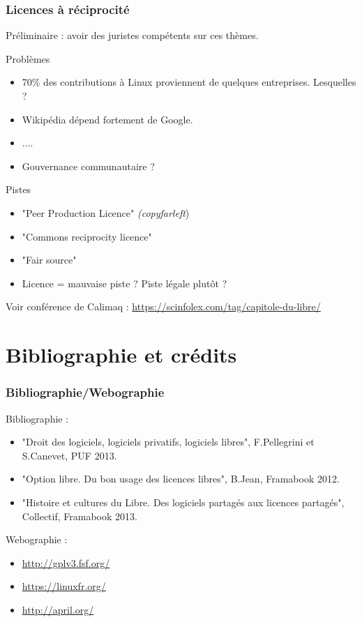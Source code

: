 \documentclass{beamer}
\begin{document}
\begin{frame}\frametitle{Licences à réciprocité}

  Préliminaire : avoir des juristes compétents sur ces thèmes.

  \begin{block}{Problèmes}
    \begin{itemize}
    \item 70\% des contributions à Linux proviennent de quelques
      entreprises. Lesquelles ?
    \item Wikipédia dépend fortement de Google.
    \item ....
    \item Gouvernance communautaire ?
    \end{itemize}
  \end{block}

  \begin{block}{Pistes}
    \begin{itemize}
    \item "Peer Production Licence" \textit{(copyfarleft})
    \item "Commons reciprocity licence"
    \item "Fair source"
    \item Licence = mauvaise piste ? Piste légale plutôt ?
    \end{itemize}
  
  \end{block}
  
  Voir conférence de Calimaq :
  \url{https://scinfolex.com/tag/capitole-du-libre/}
  
\end{frame}

\section{Bibliographie et crédits}

\begin{frame}\frametitle{Bibliographie/Webographie}

  Bibliographie :

  \begin{itemize}
  \item "Droit des logiciels, logiciels privatifs, logiciels libres",
    F.Pellegrini et S.Canevet, PUF 2013.
  \item "Option libre. Du bon usage des licences libres", B.Jean,
    Framabook 2012.
  \item "Histoire et cultures du Libre. Des logiciels partagés aux
    licences partagés", Collectif, Framabook 2013.
  \end{itemize}

  Webographie :

  \begin{itemize}
  \item \url{http://gplv3.fsf.org/}
  \item \url{https://linuxfr.org/}
  \item \url{http://april.org/}
  \end{itemize}
  
\end{frame}
\end{document}
